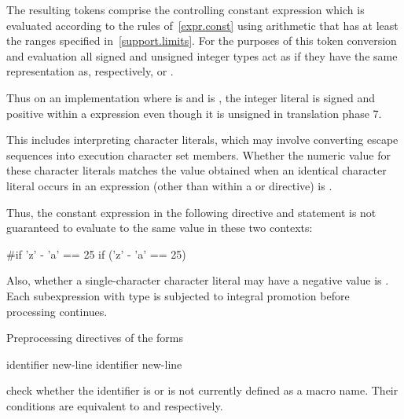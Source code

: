 \pnum
The resulting tokens comprise the controlling constant expression
which is evaluated according to the rules of~\ref{expr.const}
using arithmetic that has at least the ranges specified
in~\ref{support.limits}. For the purposes of this token conversion and evaluation
all signed and unsigned integer types
act as if they have the same representation as, respectively,
 or .
\begin{note}
Thus on an
implementation where  is 
and  is ,
the integer literal  is signed and positive within a 
expression even though it is unsigned in translation phase
7.
\end{note}
This includes interpreting character literals, which may involve
converting escape sequences into execution character set members.
Whether the numeric value for these character literals
matches the value obtained when an identical character literal
occurs in an expression
(other than within a
or
directive)
is .
\begin{note}
Thus, the constant expression in the following
directive and
statement is not guaranteed to evaluate to the same value in these two
contexts:
\begin{codeblock}
#if 'z' - 'a' == 25
if ('z' - 'a' == 25)
\end{codeblock}
\end{note}
Also, whether a single-character character literal may have a negative
value is .
Each subexpression with type
is subjected to integral promotion before processing continues.

\pnum
Preprocessing directives of the forms

\begin{ncbnftab}
\>\>identifier new-line \br
{}%
\>\>identifier new-line 
%
\end{ncbnftab}

check whether the identifier is or is not currently defined as a macro name.
Their conditions are equivalent to
and
respectively.

